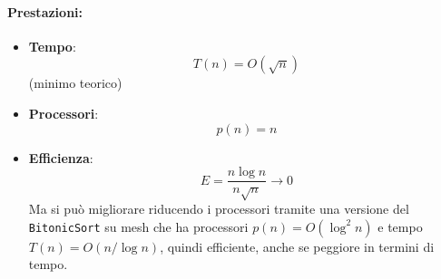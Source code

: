 \nn

\paragraph{Prestazioni:}
\begin{itemize}
	\item \textbf{Tempo}:
	$$ T(n) = O (\sqrt{n})$$
	(minimo teorico)
	\item \textbf{Processori}: 
	$$ p(n) = n $$
	\item \textbf{Efficienza}:
	$$ E = \frac{n \log n}{n \sqrt{n}} \rightarrow 0 $$
	Ma si può migliorare riducendo i processori tramite una versione del \texttt{BitonicSort} su mesh che ha processori $p(n) = O(\log^2 n)$ e tempo $T(n) = O(n / \log n)$, quindi efficiente, anche se peggiore in termini di tempo.\\
\end{itemize}

